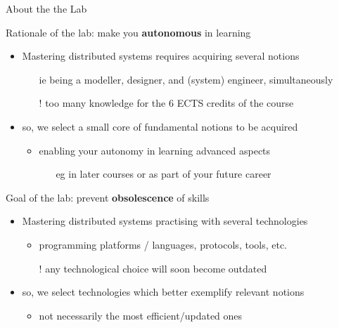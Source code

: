 \documentclass[presentation]{beamer}\mode<presentation>{\usetheme{AMSBolognaFC}}
\begin{document}
\begin{frame}[c, allowframebreaks]{About the the Lab}

    \begin{block}{Rationale of the lab: make you \textbf{autonomous} in learning}
        \begin{itemize}
            \item Mastering distributed systems requires acquiring several notions
            \begin{itemize}
                \item[ie] being a modeller, designer, and (system) engineer, simultaneously
                \item[!] too many knowledge for the 6 ECTS credits of the course
            \end{itemize}

            \item so, we select a small core of fundamental notions to be acquired
            \begin{itemize}
                \item enabling your autonomy in learning advanced aspects
                \begin{itemize}
                    \item[eg] in later courses or as part of your future career
                \end{itemize}
            \end{itemize}
        \end{itemize}
    \end{block}

    \begin{block}{Goal of the lab: prevent \textbf{obsolescence} of skills}
        \begin{itemize}
            \item Mastering distributed systems practising with several technologies
            \begin{itemize}
                \item programming platforms / languages, protocols, tools, etc.
                \item[!] any technological choice will soon become \alert{outdated}
            \end{itemize}

            \item so, we select technologies which better exemplify relevant notions
            \begin{itemize}
                \item not necessarily the most efficient/updated ones
            \end{itemize}


\end{itemize}
\end{block}
\end{frame}
\end{document}
